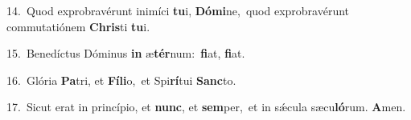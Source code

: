 {\numbfont\textcolor{\numbcolor}{14.}}~Quod exprobravérunt inimíci \textbf{tu}\-i, \textbf{Dó}\-\textbf{mi}ne,~\star quod exprobravérunt commutatiónem \textbf{Chris}\-ti \textbf{tu}\-i.\par
{\numbfont\textcolor{\numbcolor}{15.}}~Benedíctus Dóminus \textbf{in} æ\-\textbf{tér}\-num:~\star \textbf{fi}\-at, \textbf{fi}\-at.\par
{\numbfont\textcolor{\numbcolor}{16.}}~Glória \textbf{Pa}\-tri, et \textbf{Fí}\-\textbf{li}o,~\star et Spi\-\textbf{rí}\-tui \textbf{Sanc}\-to.\par
{\numbfont\textcolor{\numbcolor}{17.}}~Sicut erat in princípio, et \textbf{nunc}\-, et \textbf{sem}\-per,~\star et in sǽcula sæcu\-\textbf{ló}\-rum. \textbf{A}\-men.\par
